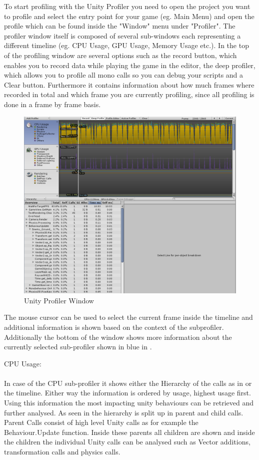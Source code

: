 To start profiling with the Unity Profiler you need to open the project you want to profile and select the entry point for your game (eg. Main Menu) and open the profile which can be found inside the "Window" menu under "Profiler". The profiler window itself is composed of several sub-windows each representing a different timeline (eg. CPU Usage, GPU Usage, Memory Usage etc.). In the top of the profiling window are several options such as the record button, which enables you to record data while playing the game in the editor, the deep profiler, which allows you to profile all mono calls so you can debug your scripts and a Clear button. Furthermore it contains information about how much frames where recorded in total and which frame you are currently profiling, since all profiling is done in a frame by frame basis.  

\begin{figure}[htbp]
\includegraphics[scale = 0.29]{img/Unity_Profiler.PNG}
\caption{Unity Profiler Window}
\label{fig:UnityProfiler}
\end{figure}

The mouse cursor can be used to select the current frame inside the timeline and additional information is shown based on the context of the subprofiler. Additionally the bottom of the window shows more information about the currently selected sub-profiler shown in blue in . \pagebreak

CPU Usage: \\ 
\\
In case of the CPU sub-profiler it shows either the Hierarchy of the calls as in  or the timeline. Either way the information is ordered by usage, highest usage first. Using this information the most impacting unity behaviours can be retrieved and further analysed. As seen in  the hierarchy is split up in parent and child calls. Parent Calls consist of high level Unity calls as for example the Behaviour.Update function. Inside these parents all children are shown and inside the children the individual Unity calls can be analysed such as Vector additions, transformation calls and physics calls.

